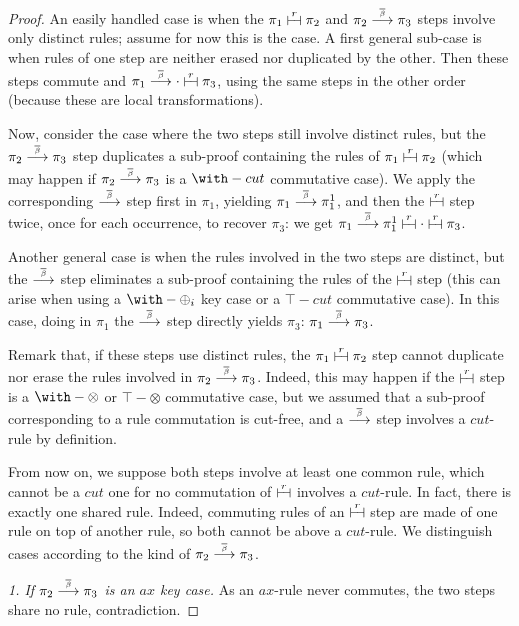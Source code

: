 \documentclass{lmcs}
\newcommand*{\tens}{\otimes} %
\newcommand{\symboltext}[2]{\mathrel{\overset{\makebox[0pt]{\mbox{\normalfont\tiny\sffamily \ensuremath{#1}}}}{#2}}} %
\newcommand{\betabar}{\overline{\beta}}
\newcommand{\betabarto}{\symboltext{\betabar}{\longrightarrow}}
\newcommand{\vdashv}{\mathrel{\lower .22ex \hbox{$\vdash\!\dashv$}}}
\DeclareRobustCommand{\astsymbol}[1]{\mathrel{\ooalign{{$\vdashv$}\crcr{$\stackrel{#1}{\hphantom{\vdashv}\vphantom{\to}}$}}}}
\newcommand{\eqcone}{\astsymbol{r}} %
\newcommand*{\proofpar}[1]{\textit{#1}}
\begin{document}
\begin{proof}
An easily handled case is when the $\pi_1\eqcone\pi_2$ and $\pi_2\betabarto\pi_3$ steps involve only distinct rules; assume for now this is the case.
A first general sub-case is when rules of one step are neither erased nor duplicated by the other.
Then these steps commute and $\pi_1\betabarto\cdot\eqcone\pi_3$, using the same steps in the other order (because these are local transformations).

Now, consider the case where the two steps still involve distinct rules, but the $\pi_2\betabarto\pi_3$ step duplicates a sub-proof containing the rules of $\pi_1\eqcone\pi_2$ (which may happen if $\pi_2\betabarto\pi_3$ is a $\with-cut$ commutative case).
We apply the corresponding $\betabarto$ step first in $\pi_1$, yielding $\pi_1\betabarto\pi_1^1$, and then the $\eqcone$ step twice, once for each occurrence, to recover $\pi_3$: we get $\pi_1\betabarto\pi_1^1\eqcone\cdot\eqcone\pi_3$.

Another general case is when the rules involved in the two steps are distinct, but the $\betabarto$ step eliminates a sub-proof containing the rules of the $\eqcone$ step (this can arise when using a $\with-\oplus_i$ key case or a $\top-cut$ commutative case).
In this case, doing in $\pi_1$ the $\betabarto$ step directly yields $\pi_3$: $\pi_1\betabarto\pi_3$.

Remark that, if these steps use distinct rules, the $\pi_1\eqcone\pi_2$ step cannot duplicate nor erase the rules involved in $\pi_2\betabarto\pi_3$.
Indeed, this may happen if the $\eqcone$ step is a $\with-\tens$ or $\top-\tens$ commutative case, but we assumed that a sub-proof corresponding to a rule commutation is cut-free, and a $\betabarto$ step involves a $cut$-rule by definition.

From now on, we suppose both steps involve at least one common rule, which cannot be a $cut$ one for no commutation of $\eqcone$ involves a $cut$-rule.
In fact, there is exactly one shared rule.
Indeed, commuting rules of an $\eqcone$ step are made of one rule on top of another rule, so both cannot be above a $cut$-rule.
We distinguish cases according to the kind of $\pi_2\betabarto\pi_3$.

\proofpar{1. If $\pi_2\betabarto\pi_3$ is an $ax$ key case.}
As an $ax$-rule never commutes, the two steps share no rule, contradiction.


\end{proof}
\end{document}
